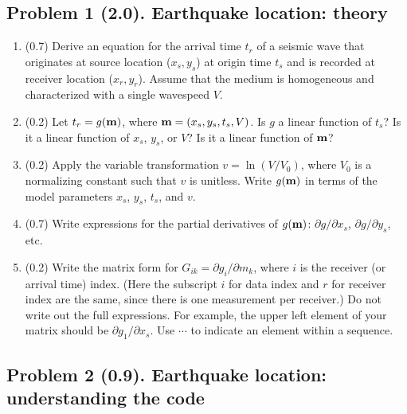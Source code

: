 \documentclass[11pt,titlepage,fleqn]{article}
\begin{document}

\subsection*{Problem 1 (2.0). Earthquake location: theory}

\begin{enumerate}
\item (0.7) Derive an equation for the arrival time $t_r$ of a seismic wave that originates at source location ($x_s, y_s$) at origin time $t_s$ and is recorded at receiver location ($x_r, y_r$). Assume that the medium is homogeneous and characterized with a single wavespeed $V$.

\item (0.2) Let $t_r = g(\mbox{${\bf m}$})$, where $\mbox{${\bf m}$} = (x_s,y_s,t_s,V)$.
Is $g$ a linear function of $t_s$? Is it a linear function of $x_s$, $y_s$, or $V$?
Is it a linear function of $\mbox{${\bf m}$}$?

\item (0.2) Apply the variable transformation $v = \ln(V/V_0)$, where $V_0$ is a normalizing constant such that $v$ is unitless. Write $g(\mbox{${\bf m}$})$ in terms of the model parameters $x_s$, $y_s$, $t_s$, and $v$.

\item (0.7) Write expressions for the partial derivatives of $g(\mbox{${\bf m}$})$: $\partial g/ \partial x_s$, $\partial g/ \partial y_s$, etc.

\item (0.2) Write the matrix form for $G_{ik} = \partial g_i/ \partial m_k$, where $i$ is the receiver (or arrival time) index. (Here the subscript $i$ for data index and $r$ for receiver index are the same, since there is one measurement per receiver.) Do not write out the full expressions.
For example, the upper left element of your matrix should be $\partial g_1/\partial x_s$.
Use $\cdots$ to indicate an element within a sequence.

\end{enumerate}


\pagebreak
\subsection*{Problem 2 (0.9). Earthquake location: understanding the code}
\end{document}
